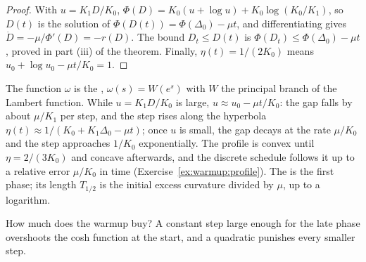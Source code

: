 \begin{refsection}

\begin{proof}
With $u=K_1D/K_0$, $\Phi(D)=K_0(u+\log u)+K_0\log(K_0/K_1)$, so $D(t)$ is the solution of $\Phi(D(t))=\Phi(\Delta_0)-\mu t$, and differentiating gives $\dot D=-\mu/\Phi'(D)=-r(D)$. The bound $D_t\le D(t)$ is $\Phi(D_t)\le\Phi(\Delta_0)-\mu t$, proved in part (iii) of the theorem. Finally, $\eta(t)=1/(2K_0)$ means $u_0+\log u_0-\mu t/K_0=1$.
\end{proof}

The function $\omega$ is the , $\omega(s)=W(e^s)$ with $W$ the principal branch of the Lambert function. While $u=K_1D/K_0$ is large, $u\approx u_0-\mu t/K_0$: the gap falls by about $\mu/K_1$ per step, and the step rises along the hyperbola $\eta(t)\approx1/(K_0+K_1\Delta_0-\mu t)$; once $u$ is small, the gap decays at the rate $\mu/K_0$ and the step approaches $1/K_0$ exponentially. The profile is convex until $\eta=2/(3K_0)$ and concave afterwards, and the discrete schedule follows it up to a relative error $\mu/K_0$ in time (Exercise~\ref{ex:warmup:profile}). The  is the first phase; its length $T_{1/2}$ is the initial excess curvature divided by $\mu$, up to a logarithm.

How much does the warmup buy? A constant step large enough for the late phase overshoots the cosh function at the start, and a quadratic punishes every smaller step.


\end{refsection}
